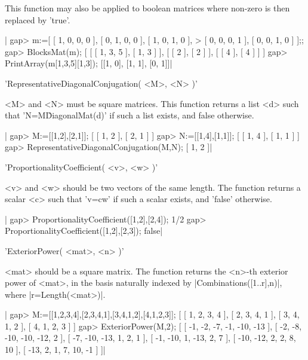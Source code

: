 This function  may also  be applied to boolean matrices
where non-zero is then replaced by 'true'.

|    gap> m:=[ [ 1, 0, 0, 0 ], [ 0, 1, 0, 0 ], [ 1, 0, 1, 0 ],
    >  [ 0, 0, 0, 1 ], [ 0, 0, 1, 0 ] ];;
    gap> BlocksMat(m);
    [ [ [ 1, 3, 5 ], [ 1, 3 ] ], [ [ 2 ], [ 2 ] ], [ [ 4 ], [ 4 ] ] ]
    gap> PrintArray(m{[1,3,5]}{[1,3]});
    [[1, 0],
     [1, 1],
     [0, 1]]|


'RepresentativeDiagonalConjugation( <M>, <N> )'

<M>  and <N> must be  square matrices. This function  returns a list <d>
such  that  'N=M\^DiagonalMat(d)'  if  such  a  list  exists,  and  false
otherwise.

|    gap> M:=[[1,2],[2,1]];
    [ [ 1, 2 ], [ 2, 1 ] ]
    gap> N:=[[1,4],[1,1]];
    [ [ 1, 4 ], [ 1, 1 ] ]
    gap> RepresentativeDiagonalConjugation(M,N);
    [ 1, 2 ]|


'ProportionalityCoefficient( <v>, <w> )'

<v>  and <w>  should be  two vectors  of the  same length.  The function
returns  a scalar <c>  such that 'v=c\*w'  if such a  scalar exists, and
'false' otherwise.

|    gap> ProportionalityCoefficient([1,2],[2,4]);
    1/2
    gap> ProportionalityCoefficient([1,2],[2,3]);
    false|


'ExteriorPower( <mat>, <n> )'

<mat>  should be  a square  matrix. The  function returns  the <n>-th exterior
power  of <mat>, in  the basis naturally  indexed by |Combinations([1..r],n)|,
where |r=Length(<mat>)|.

|    gap> M:=[[1,2,3,4],[2,3,4,1],[3,4,1,2],[4,1,2,3]];
    [ [ 1, 2, 3, 4 ], [ 2, 3, 4, 1 ], [ 3, 4, 1, 2 ], [ 4, 1, 2, 3 ] ]
    gap> ExteriorPower(M,2);
    [ [ -1, -2, -7, -1, -10, -13 ], [ -2, -8, -10, -10, -12, 2 ],
      [ -7, -10, -13, 1, 2, 1 ], [ -1, -10, 1, -13, 2, 7 ],
      [ -10, -12, 2, 2, 8, 10 ], [ -13, 2, 1, 7, 10, -1 ] ]|

